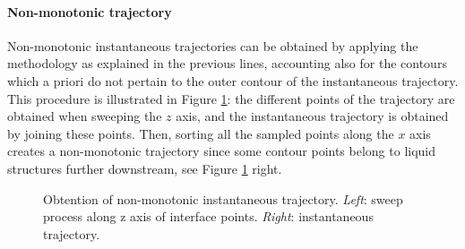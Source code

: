 
\paragraph*{{Non-monotonic trajectory}} 

Non-monotonic instantaneous trajectories can be obtained by applying the methodology as explained in the previous lines, accounting also for the contours which a priori do not pertain to the outer contour of the instantaneous trajectory. This procedure is illustrated in Figure \ref{fig:trajectory_obtention_instantaneous_method_a}: the different points of the trajectory are obtained when sweeping the $z$ axis, and the instantaneous trajectory is obtained by joining these points. Then, sorting all the sampled points along the $x$ axis creates a non-monotonic trajectory since some contour points belong to liquid structures further downstream, see Figure \ref{fig:trajectory_obtention_instantaneous_method_a} right.

\begin{figure}[ht]
     \centering
     \begin{subfigure}[b]{0.45\textwidth}
         \centering
     \end{subfigure}
     \begin{subfigure}[b]{0.45\textwidth}
         \centering
     \end{subfigure}
        \caption[Obtention of non-monotonic instantaneous trajectory]{Obtention of non-monotonic instantaneous trajectory. \textsl{Left}: sweep process along z axis of interface points. \textsl{Right}: instantaneous trajectory.}
        \label{fig:trajectory_obtention_instantaneous_method_a}
\end{figure}

\clearpage

